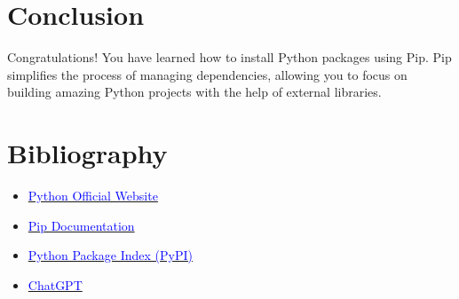 \documentclass[a4paper, 12pt]{report}
\begin{document}
    \section{Conclusion}
        Congratulations! You have learned how to install Python packages using Pip. Pip simplifies the process of managing dependencies, allowing you to focus on building amazing Python projects with the help of external libraries.

    \newpage
    
    \section{Bibliography}
        \begin{itemize}
            \item \href{https://www.python.org}{\textcolor{blue}{Python Official Website}}
            \item \href{https://pip.pypa.io/en/stable/}{\textcolor{blue}{Pip Documentation}}
            \item \href{https://pypi.org/}{\textcolor{blue}{Python Package Index (PyPI)}}
            \item \href{https://chat.openai.com/}{\textcolor{blue}{ChatGPT}}
        \end{itemize}
\end{document}
